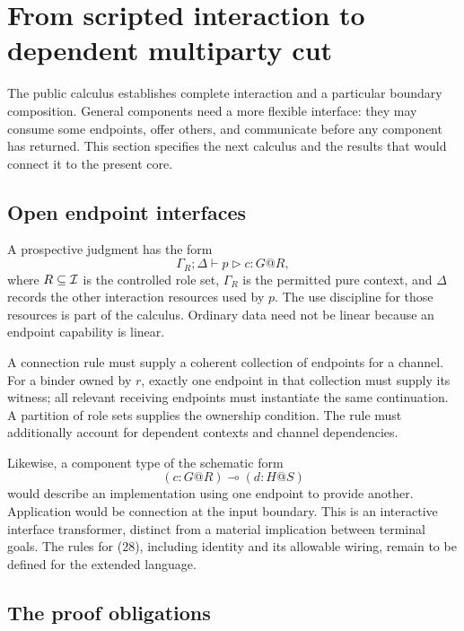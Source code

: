 \section{From scripted interaction to dependent multiparty cut}
\label{sec:development}

The public calculus establishes complete interaction and a particular
boundary composition. General components need a more flexible interface:
they may consume some endpoints, offer others, and communicate before any
component has returned. This section specifies the next calculus and the
results that would connect it to the present core.

\subsection{Open endpoint interfaces}

A prospective judgment has the form
\[
 \Gamma_R;\Delta\vdash p\mathrel{\triangleright}c:G@R,
 \tag{27}
\]
where $R\subseteq\mathcal I$ is the controlled role set, $\Gamma_R$ is the
permitted pure context, and $\Delta$ records the other interaction resources
used by $p$. The use discipline for those resources is part of the calculus.
Ordinary data need not be linear because an endpoint capability is linear.

A connection rule must supply a coherent collection of endpoints for a
channel. For a binder owned by $r$, exactly one endpoint in that collection
must supply its witness; all relevant receiving endpoints must instantiate
the same continuation. A partition of role sets supplies the ownership
condition. The rule must additionally account for dependent contexts and
channel dependencies.

Likewise, a component type of the schematic form
\[
 (c:G@R)\multimap(d:H@S)
 \tag{28}
\]
would describe an implementation using one endpoint to provide another.
Application would be connection at the input boundary. This is an interactive
interface transformer, distinct from a material implication between terminal
goals. The rules for (28), including identity and its allowable wiring, remain
to be defined for the extended language.

\subsection{The proof obligations}

